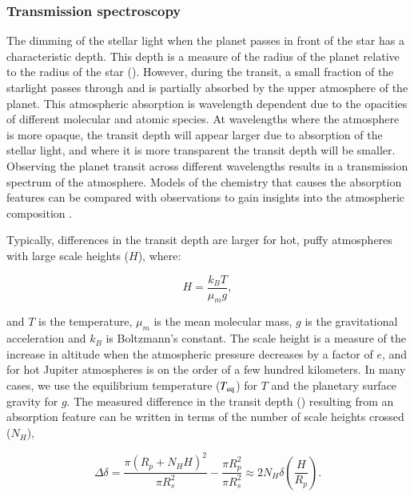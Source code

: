 \subsubsection{Transmission spectroscopy}

The dimming of the stellar light when the planet passes in front of the star has a characteristic depth. This depth is a measure of the radius of the planet relative to the radius of the star (\rprss). However, during the transit, a small fraction of the starlight passes through and is partially absorbed by the upper atmosphere of the planet. This atmospheric absorption is wavelength dependent due to the opacities of different molecular and atomic species. At wavelengths where the atmosphere is more opaque, the transit depth will appear larger due to absorption of the stellar light, and where it is more transparent the transit depth will be smaller. Observing the planet transit across different wavelengths results in a transmission spectrum of the atmosphere. Models of the chemistry that causes the absorption features can be compared with observations to gain insights into the atmospheric composition \citep{Charbonneau2002, Vidal-Madjar2003, Tinetti2007, Swain2008}.

Typically, differences in the transit depth are larger for hot, puffy atmospheres with large scale heights ($H$), where:

\begin{equation}
    H = \frac{k_B T}{\mu_m g},
\end{equation}

and $T$ is the temperature, $\mu_m$ is the mean molecular mass, $g$ is the gravitational acceleration and $k_B$ is Boltzmann's constant. The scale height is a measure of the increase in altitude when the atmospheric pressure decreases by a factor of $e$, and for hot Jupiter atmospheres is on the order of a few hundred kilometers. In many cases, we use the equilibrium temperature ($T_{\rm eq}$) for $T$ and the planetary surface gravity for $g$. The measured difference in the transit depth (\rprss) resulting from an absorption feature can be written in terms of the number of scale heights crossed ($N_H$),

\begin{equation}
\Delta \delta = \frac{\pi(R_p + N_H H)^2}{\pi R_s^2} -
\frac{\pi R_p^2}{\pi R_s^2}
 \approx 2 N_H \delta \left(\frac{H}{R_p}\right).
\label{int:eq:NH}
\end{equation}

